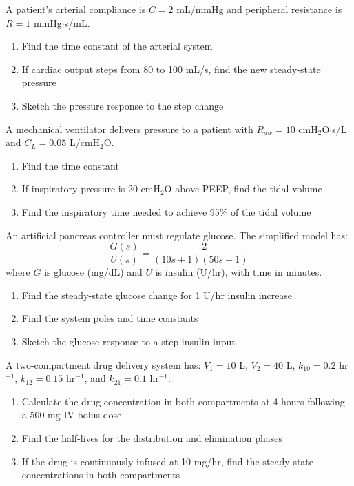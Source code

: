 \begin{exercise}
A patient's arterial compliance is $C = 2$ mL/mmHg and peripheral resistance is $R = 1$ mmHg$\cdot$s/mL.
\begin{enumerate}[label=(\alph*)]
    \item Find the time constant of the arterial system
    \item If cardiac output steps from 80 to 100 mL/s, find the new steady-state pressure
    \item Sketch the pressure response to the step change
\end{enumerate}
\end{exercise}

\begin{exercise}
A mechanical ventilator delivers pressure to a patient with $R_{aw} = 10$ cmH$_2$O$\cdot$s/L and $C_L = 0.05$ L/cmH$_2$O.
\begin{enumerate}[label=(\alph*)]
    \item Find the time constant
    \item If inspiratory pressure is 20 cmH$_2$O above PEEP, find the tidal volume
    \item Find the inspiratory time needed to achieve 95\% of the tidal volume
\end{enumerate}
\end{exercise}

\begin{exercise}
An artificial pancreas controller must regulate glucose. The simplified model has:
\begin{equation}
\frac{G(s)}{U(s)} = \frac{-2}{(10s+1)(50s+1)}
\end{equation}
where $G$ is glucose (mg/dL) and $U$ is insulin (U/hr), with time in minutes.
\begin{enumerate}[label=(\alph*)]
    \item Find the steady-state glucose change for 1 U/hr insulin increase
    \item Find the system poles and time constants
    \item Sketch the glucose response to a step insulin input
\end{enumerate}
\end{exercise}

\begin{exercise}
A two-compartment drug delivery system has: $V_1 = 10$ L, $V_2 = 40$ L, $k_{10} = 0.2$ hr$^{-1}$, $k_{12} = 0.15$ hr$^{-1}$, and $k_{21} = 0.1$ hr$^{-1}$.
\begin{enumerate}[label=(\alph*)]
    \item Calculate the drug concentration in both compartments at 4 hours following a 500 mg IV bolus dose
    \item Find the half-lives for the distribution and elimination phases
    \item If the drug is continuously infused at 10 mg/hr, find the steady-state concentrations in both compartments
\end{enumerate}
\end{exercise}

